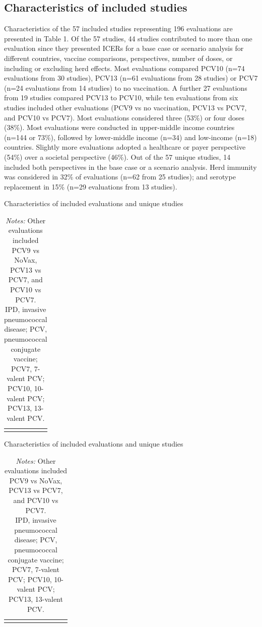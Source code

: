 \documentclass[12pt]{article}
\begin{document}
\subsection*{Characteristics of included studies}
Characteristics of the 57 included studies representing 196 evaluations are presented in Table 1. Of the 57 studies, 44 studies contributed to more than one evaluation  since they presented ICERs for a base case or scenario analysis for different countries, vaccine comparisons, perspectives, number of doses, or including or excluding herd effects. Most evaluations compared PCV10 (n=74 evaluations from 30 studies), PCV13 (n=61 evaluations from 28 studies) or PCV7 (n=24 evaluations from 14 studies) to no vaccination. A further 27 evaluations from 19 studies compared PCV13 to PCV10, while ten evaluations from six studies included other evaluations (PCV9 vs no vaccination, PCV13 vs PCV7, and PCV10 vs PCV7). Most evaluations considered three (53\%) or four doses (38\%). Most evaluations were conducted in upper-middle income countries (n=144 or 73\%), followed by lower-middle income (n=34) and low-income (n=18) countries. Slightly more evaluations adopted a healthcare or payer perspective (54\%) over a societal perspective (46\%). Out of the 57 unique studies, 14 included both perspectives in the base case or a scenario analysis. Herd immunity was considered in 32\% of evaluations (n=62 from 25 studies); and serotype replacement in 15\% (n=29 evaluations from 13 studies). 

\begin{table}[H]
    \centering \singlespacing \small
    \caption{Characteristics of included evaluations and unique studies}
    \begin{tabular}{|L{6cm}|R{4.5cm}|R{4cm}|}
        \hline
    \end{tabular}
    \label{tab_evals_studies}
    \caption*{\footnotesize \textit{Notes:} Other evaluations included PCV9 vs NoVax, PCV13 vs PCV7, and PCV10 vs PCV7. \\
    IPD, invasive pneumococcal disease; PCV, pneumococcal conjugate vaccine; PCV7, 7-valent PCV; PCV10, 10-valent PCV; PCV13, 13-valent PCV. 
}
\end{table}

\begin{table}[H]
    \centering \singlespacing \small
    \caption{Characteristics of included evaluations and unique studies}
    \begin{tabular}{|L{2.8cm}|C{1.8cm}|C{1.3cm}|C{1cm}|C{1cm}|C{1cm}|C{1cm}|C{1cm}|C{1cm}|}
        \hline
    \end{tabular}
    \label{tab_evals_thresholds}
    \caption*{\footnotesize \textit{Notes:} Other evaluations included PCV9 vs NoVax, PCV13 vs PCV7, and PCV10 vs PCV7. \\
    IPD, invasive pneumococcal disease; PCV, pneumococcal conjugate vaccine; PCV7, 7-valent PCV; PCV10, 10-valent PCV; PCV13, 13-valent PCV. 
}
\end{table}
\end{document}

